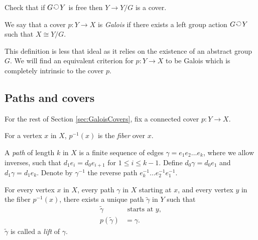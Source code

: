 \begin{qbox}
  Check that if $G \groupaction Y$ is free then $Y \rightarrow Y/G$ is a cover.
\end{qbox}
\begin{definition}
  We say that a cover $p:Y \rightarrow X$ is \emph{Galois} if there exists a left group action $G \groupaction Y$ such that $X \cong Y/G$.
\end{definition}
This definition is less that ideal as it relies on the existence of an abstract group $G$.
We will find an equivalent criterion for $p:Y \rightarrow X$ to be Galois which is completely intrinsic to the cover $p$.











\subsection{Paths and covers}
For the rest of Section \ref{sec:GaloisCovers}, fix a connected cover $p: Y \longrightarrow X$.

\begin{definition}
  For a vertex $x$ in $X$, $p^{-1}(x)$ is the \emph{fiber} over $x$.
\end{definition}



A \emph{path} of length $k$ in $X$ is a finite sequence of edges $\gamma = e_1 e_2 \dots e_k$, where we allow inverses, such that $d_1 e_i = d_0 e_{i+1}$ for $1 \le i \le k-1$.
Define $d_0 \gamma = d_0 e_1$ and $d_1 \gamma = d_1 e_k$.
Denote by $\gamma^{-1}$ the reverse path $e_k^{-1} \dots e_2^{-1} e_1^{-1}$.


  \begin{theorem}
    \label{theorem:uniqueLiftingPaths}
    For every vertex $x$ in $X$, every path $\gamma$ in $X$ starting at $x$, and every vertex $y$ in the fiber $p^{-1}(x)$, there exists a unique path $\widetilde{\gamma}$ in $Y$ such that
    \begin{align*}
      \widetilde{\gamma} & \mbox{ starts at } y, \\
      p (\widetilde{\gamma}) &= \gamma.
    \end{align*}
    $\widetilde{\gamma}$ is called a \emph{lift} of $\gamma$.
  \end{theorem}

